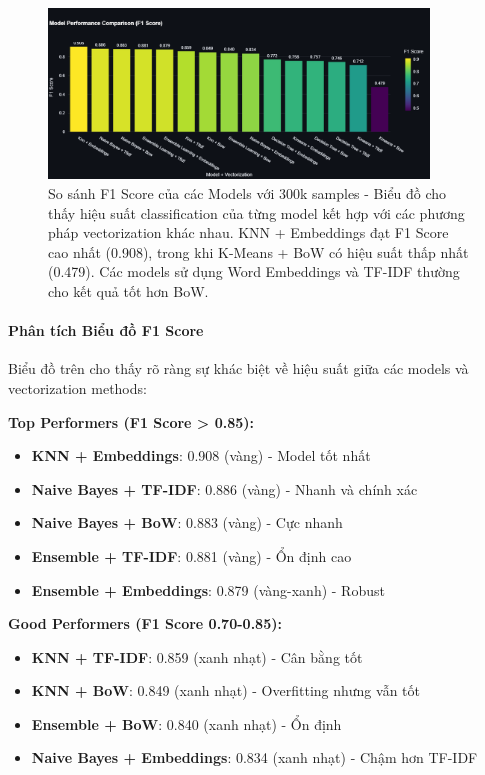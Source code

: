 \begin{figure}[H]
\centering
\includegraphics[width=0.9\textwidth]{image/Chart 300k samples.png}
\caption{So sánh F1 Score của các Models với 300k samples - Biểu đồ cho thấy hiệu suất classification của từng model kết hợp với các phương pháp vectorization khác nhau. KNN + Embeddings đạt F1 Score cao nhất (0.908), trong khi K-Means + BoW có hiệu suất thấp nhất (0.479). Các models sử dụng Word Embeddings và TF-IDF thường cho kết quả tốt hơn BoW.}
\label{fig:f1_score_comparison}
\end{figure}

\paragraph{Phân tích Biểu đồ F1 Score}

Biểu đồ trên cho thấy rõ ràng sự khác biệt về hiệu suất giữa các models và vectorization methods:

\textbf{Top Performers (F1 Score > 0.85):}
\begin{itemize}
    \item \textbf{KNN + Embeddings}: 0.908 (vàng) - Model tốt nhất
    \item \textbf{Naive Bayes + TF-IDF}: 0.886 (vàng) - Nhanh và chính xác
    \item \textbf{Naive Bayes + BoW}: 0.883 (vàng) - Cực nhanh
    \item \textbf{Ensemble + TF-IDF}: 0.881 (vàng) - Ổn định cao
    \item \textbf{Ensemble + Embeddings}: 0.879 (vàng-xanh) - Robust
\end{itemize}

\textbf{Good Performers (F1 Score 0.70-0.85):}
\begin{itemize}
    \item \textbf{KNN + TF-IDF}: 0.859 (xanh nhạt) - Cân bằng tốt
    \item \textbf{KNN + BoW}: 0.849 (xanh nhạt) - Overfitting nhưng vẫn tốt
    \item \textbf{Ensemble + BoW}: 0.840 (xanh nhạt) - Ổn định
    \item \textbf{Naive Bayes + Embeddings}: 0.834 (xanh nhạt) - Chậm hơn TF-IDF
\end{itemize}

